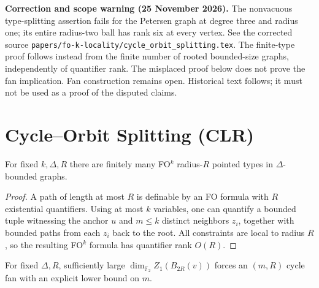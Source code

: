 \par\noindent\textbf{Correction and scope warning (25 November 2026).} The nonvacuous type-splitting assertion fails for the Petersen graph at degree three and radius one; its entire radius-two ball has rank six at every vertex. See the corrected source \texttt{papers/fo-k-locality/cycle\_orbit\_splitting.tex}. The finite-type proof follows instead from the finite number of rooted bounded-size graphs, independently of quantifier rank. The misplaced proof below does not prove the fan implication. Fan construction remains open. Historical text follows; it must not be used as a proof of the disputed claims.\par
\section*{Cycle--Orbit Splitting (CLR)}

\begin{lemma}
For fixed $k,\Delta,R$ there are finitely many FO$^k$ radius-$R$ pointed types in $\Delta$-bounded graphs.
\end{lemma}

\begin{proof}
A path of length at most $R$ is definable by an FO formula with $R$ existential quantifiers.
Using at most $k$ variables, one can quantify a bounded tuple witnessing the anchor $u$ and
$m\le k$ distinct neighbors $z_i$, together with bounded paths from each $z_i$ back to the root.
All constraints are local to radius $R$, so the resulting FO$^k$ formula has quantifier rank $O(R)$.
\end{proof}


\begin{lemma}
For fixed $\Delta,R$, sufficiently large
$\dim_{\mathbb F_2} Z_1(B_{2R}(v))$ forces an $(m,R)$ cycle fan
with an explicit lower bound on $m$.
\end{lemma}

